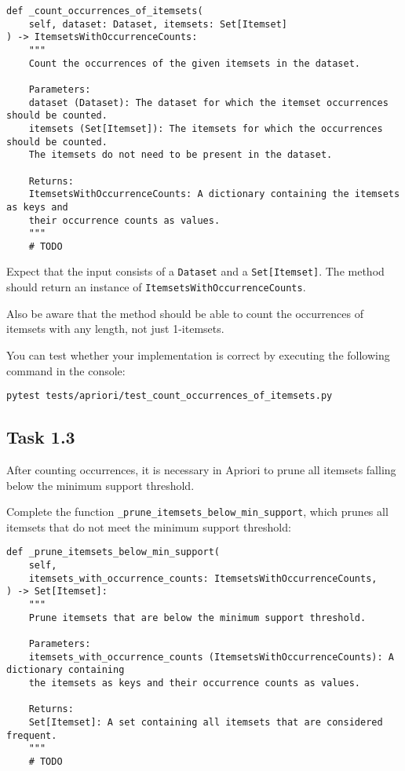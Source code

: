 \documentclass[
english,
smallborders
]{i6prcsht}
\begin{document}
\vspace*{0.3cm}

\begin{lstlisting}
def _count_occurrences_of_itemsets(
	self, dataset: Dataset, itemsets: Set[Itemset]
) -> ItemsetsWithOccurrenceCounts:
	"""
    Count the occurrences of the given itemsets in the dataset.

	Parameters:
	dataset (Dataset): The dataset for which the itemset occurrences should be counted.
	itemsets (Set[Itemset]): The itemsets for which the occurrences should be counted.
	The itemsets do not need to be present in the dataset.

	Returns:
	ItemsetsWithOccurrenceCounts: A dictionary containing the itemsets as keys and
	their occurrence counts as values.
	"""
	# TODO
\end{lstlisting}

\vspace*{0.1cm}

Expect that the input consists of a \texttt{Dataset} and a \texttt{Set[Itemset]}. The method should return an instance of \texttt{ItemsetsWithOccurrenceCounts}.

Also be aware that the method should be able to count the occurrences of itemsets with any length, not just 1-itemsets.

You can test whether your implementation is correct by executing the following command in the console:

\vspace*{0.3cm}

\begin{lstlisting}
pytest tests/apriori/test_count_occurrences_of_itemsets.py
\end{lstlisting}

\vspace*{0.1cm}

\subsection*{Task 1.3}

After counting occurrences, it is necessary in Apriori to prune all itemsets falling below the minimum support threshold.

Complete the function \texttt{\_prune\_itemsets\_below\_min\_support}, which prunes all itemsets that do not meet the minimum support threshold:

\vspace*{0.3cm}

\begin{lstlisting}
def _prune_itemsets_below_min_support(
	self,
	itemsets_with_occurrence_counts: ItemsetsWithOccurrenceCounts,
) -> Set[Itemset]:
	"""
	Prune itemsets that are below the minimum support threshold.

	Parameters:
	itemsets_with_occurrence_counts (ItemsetsWithOccurrenceCounts): A dictionary containing
	the itemsets as keys and their occurrence counts as values.

	Returns:
	Set[Itemset]: A set containing all itemsets that are considered frequent.
	"""
 	# TODO
\end{lstlisting}
\end{document}
